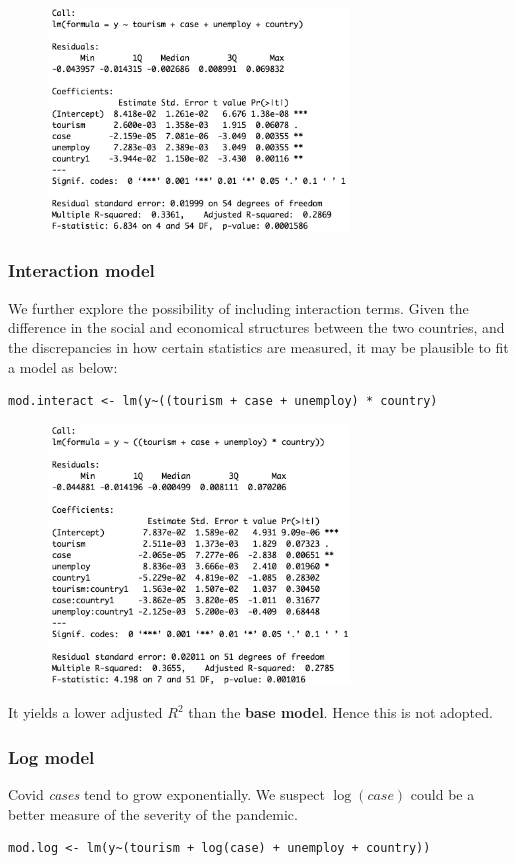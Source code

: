 \documentclass{article}
\begin{document}
\begin{figure}[H]
\centering
  \includegraphics[width=8cm]{summary-base.png}
  \label{fig:QQ}
\end{figure}
 
\subsubsection*{Interaction model}
We further explore the possibility of including interaction terms. Given the difference in the social and economical structures between the two countries, and the discrepancies in how certain statistics are measured, it may be plausible to fit a model as below:
\begin{verbatim}
mod.interact <- lm(y~((tourism + case + unemploy) * country)
\end{verbatim}

\begin{figure}[H]
\centering
  \includegraphics[width= 8cm]{summary-interact.png}
  \label{fig:QQ}
\end{figure}
 It yields a lower adjusted $R^2$ than the \textbf{base model}. Hence this is not adopted.
 
\subsubsection*{Log model}
Covid \textit{cases} tend to grow exponentially. We suspect $\log(case)$ could be a better measure of the severity of the pandemic.
\begin{verbatim}
mod.log <- lm(y~(tourism + log(case) + unemploy + country))
\end{verbatim}
\end{document}
